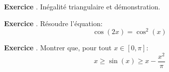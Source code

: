 \documentclass[10pt,a4paper]{article}
\newcounter{question}
\newcounter{exo}
\newenvironment{exo}{\vspace{0.5cm}\setcounter{question}{0}\addtocounter{exo}{1} \noindent \textbf{Exercice \theexo}. \normalsize }{\par}
\begin{document}
	\begin{exo}
		Inégalité triangulaire et démonstration.
	\end{exo}
	
	\begin{exo}
		Résoudre l'équation:
		$$\cos(2x) = \cos^2(x)$$
	\end{exo}
	
	\begin{exo}
		Montrer que, pour tout $x \in [0, \pi]$:
		$$x \geq \sin(x) \geq x - \frac{x^2}{\pi}$$
	\end{exo}
\end{document}
